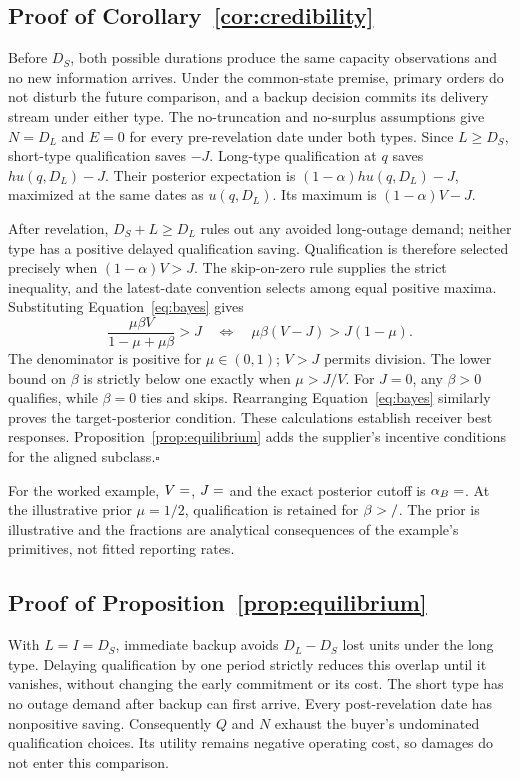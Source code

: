 \documentclass[preprint,11pt,authoryear]{elsarticle}
\begin{document}
\subsection{Proof of Corollary~\ref{cor:credibility}}
Before $D_S$, both possible durations produce the same capacity observations and no new information arrives. Under the common-state premise, primary orders do not disturb the future comparison, and a backup decision commits its delivery stream under either type. The no-truncation and no-surplus assumptions give $N=D_L$ and $E=0$ for every pre-revelation date under both types. Since $L\ge D_S$, short-type qualification saves $-J$. Long-type qualification at $q$ saves $h u(q,D_L)-J$. Their posterior expectation is $(1-\alpha)h u(q,D_L)-J$, maximized at the same dates as $u(q,D_L)$. Its maximum is $(1-\alpha)V-J$.

After revelation, $D_S+L\ge D_L$ rules out any avoided long-outage demand; neither type has a positive delayed qualification saving. Qualification is therefore selected precisely when $(1-\alpha)V>J$. The skip-on-zero rule supplies the strict inequality, and the latest-date convention selects among equal positive maxima. Substituting Equation~\eqref{eq:bayes} gives
\[
 \frac{\mu\beta V}{1-\mu+\mu\beta}>J
 \quad\Longleftrightarrow\quad
 \mu\beta(V-J)>J(1-\mu).
\]
The denominator is positive for $\mu\in(0,1)$; $V>J$ permits division. The lower bound on $\beta$ is strictly below one exactly when $\mu>J/V$. For $J=0$, any $\beta>0$ qualifies, while $\beta=0$ ties and skips. Rearranging Equation~\eqref{eq:bayes} similarly proves the target-posterior condition. These calculations establish receiver best responses. Proposition~\ref{prop:equilibrium} adds the supplier's incentive conditions for the aligned subclass.\hfill$\square$

For the worked example, $V=\rv{toyV}$, $J=\rv{toyJ}$ and the exact posterior cutoff is $\alpha_B=\rv{toyAlphaCutoff}$. At the illustrative prior $\mu=1/2$, qualification is retained for $\beta>\rv{toyBetaNumerator}/\rv{toyBetaDenominator}$. The prior is illustrative and the fractions are analytical consequences of the example's primitives, not fitted reporting rates.

\subsection{Proof of Proposition~\ref{prop:equilibrium}}
With $L=I=D_S$, immediate backup avoids $D_L-D_S$ lost units under the long type. Delaying qualification by one period strictly reduces this overlap until it vanishes, without changing the early commitment or its cost. The short type has no outage demand after backup can first arrive. Every post-revelation date has nonpositive saving. Consequently $Q$ and $N$ exhaust the buyer's undominated qualification choices. Its utility remains negative operating cost, so damages do not enter this comparison.
\end{document}
